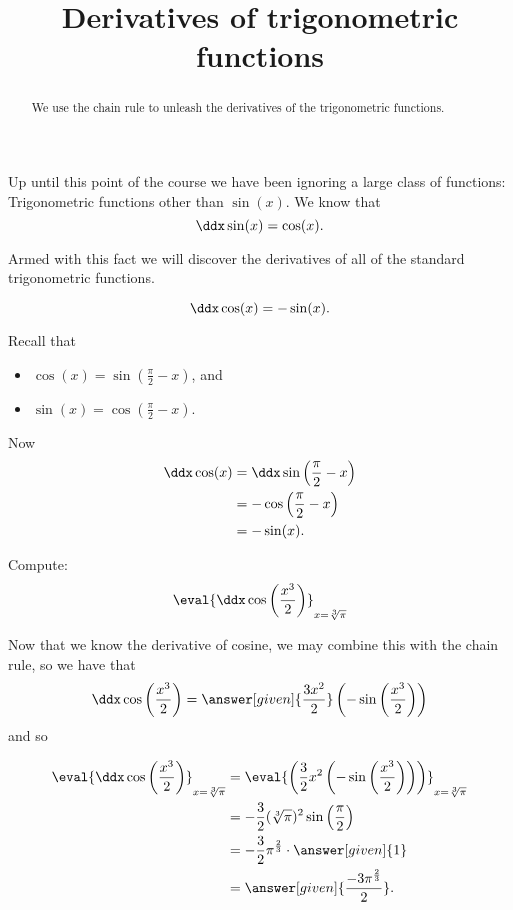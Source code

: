 \documentclass{ximera}
\title[Dig-In:]{Derivatives of trigonometric functions}
\begin{document}
\begin{abstract}
  We use the chain rule to unleash the derivatives of the
  trigonometric functions.
\end{abstract}
\maketitle

Up until this point of the course we have been ignoring a large class
of functions: Trigonometric functions other than $\sin(x)$. We know
that
\[ \ddx \sin(x) = \cos(x). \]

Armed with this fact we will discover the derivatives of all of the
standard trigonometric functions.

\begin{theorem}
	\[\ddx \cos(x) = -\sin(x). \]
	\begin{explanation}
		Recall that
		\begin{itemize}
			\item $\cos(x) = \sin\left(\frac{\pi}{2}-x\right)$, and
			\item $\sin(x) = \cos\left(\frac{\pi}{2}-x\right)$.
		\end{itemize}
		Now
		\begin{align*}
			\ddx \cos(x) &= \ddx \sin\left(\frac{\pi}{2}-x\right)\\
				&=-\cos\left(\frac{\pi}{2}-x\right) \\
				&= -\sin(x).
		\end{align*}
	\end{explanation}
\end{theorem}

\begin{example}
	Compute:
	\[ \eval{\ddx \cos \left( \frac{x^3}{2} \right)}_{x=\sqrt[3]{\pi}} \]
	\begin{explanation}
		Now that we know the derivative of cosine, we may combine this with the
		chain rule, so we have that
		\[ \ddx \cos \left( \frac{x^3}{2} \right) = \answer[given]{\frac{3 x^2}{2}} \left(- \sin \left( \frac{x^3}{2} \right) \right) \]
		and so

		\begin{align*}
			\eval{\ddx \cos \left( \frac{x^3}{2} \right)}_{x=\sqrt[3]{\pi}} 
				&= \eval{\left( \frac{3}{2} x^2 \left(- \sin \left( \frac{x^3}{2} \right) \right) \right)}_{x=\sqrt[3]{\pi}} \\
				&= - \frac{3}{2}(\sqrt[3]{\pi})^2 \sin \left( \frac{\pi}{2} \right) \\
				&= -\frac{3}{2} \pi^{\frac{2}{3}} \cdot \answer[given]{1} \\
				&=\answer[given]{\frac{-3 \pi^{\frac{2}{3}}}{2}}.
		\end{align*}
	\end{explanation}
\end{example}
\end{document}

